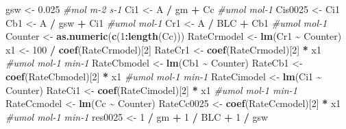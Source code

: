 \documentclass[
]{krantz}
\makeatletter
\newenvironment{Shaded}{\begin{snugshade}}{\end{snugshade}}
\newcommand{\CommentTok}[1]{\textcolor[rgb]{0.56,0.35,0.01}{\textit{#1}}}
\newcommand{\DecValTok}[1]{\textcolor[rgb]{0.00,0.00,0.81}{#1}}
\newcommand{\FloatTok}[1]{\textcolor[rgb]{0.00,0.00,0.81}{#1}}
\newcommand{\KeywordTok}[1]{\textcolor[rgb]{0.13,0.29,0.53}{\textbf{#1}}}
\newcommand{\NormalTok}[1]{#1}
\newcommand{\OperatorTok}[1]{\textcolor[rgb]{0.81,0.36,0.00}{\textbf{#1}}}
\newcommand{\StringTok}[1]{\textcolor[rgb]{0.31,0.60,0.02}{#1}}
\newenvironment{kframe}{%
\medskip{}
\setlength{\fboxsep}{.8em}
 \def\at@end@of@kframe{}%
 \ifinner\ifhmode%
  \def\at@end@of@kframe{\end{minipage}}%
  \begin{minipage}{\columnwidth}%
 \fi\fi%
 \def\FrameCommand##1{\hskip\@totalleftmargin \hskip-\fboxsep
 \colorbox{shadecolor}{##1}\hskip-\fboxsep
     \hskip-\linewidth \hskip-\@totalleftmargin \hskip\columnwidth}%
 \MakeFramed {\advance\hsize-\width
   \@totalleftmargin\z@ \linewidth\hsize
   \@setminipage}}%
 {\par\unskip\endMakeFramed%
 \at@end@of@kframe}
\renewenvironment{Shaded}{\begin{kframe}}{\end{kframe}}
\makeatother
\begin{document}
\begin{Shaded}
\begin{Highlighting}[]
\NormalTok{gsw \textless{}{-}}\StringTok{ }\FloatTok{0.025} \CommentTok{\#mol m{-}2 s{-}1}
\NormalTok{Ci1 \textless{}{-}}\StringTok{ }\NormalTok{A }\OperatorTok{/}\StringTok{ }\NormalTok{gm }\OperatorTok{+}\StringTok{ }\NormalTok{Cc }\CommentTok{\#umol mol{-}1}
\NormalTok{Cis0025 \textless{}{-}}\StringTok{ }\NormalTok{Ci1}
\NormalTok{Cb1 \textless{}{-}}\StringTok{ }\NormalTok{A }\OperatorTok{/}\StringTok{ }\NormalTok{gsw }\OperatorTok{+}\StringTok{ }\NormalTok{Ci1 }\CommentTok{\#umol mol{-}1}
\NormalTok{Cr1 \textless{}{-}}\StringTok{ }\NormalTok{A }\OperatorTok{/}\StringTok{ }\NormalTok{BLC }\OperatorTok{+}\StringTok{ }\NormalTok{Cb1 }\CommentTok{\#umol mol{-}1}
\NormalTok{Counter \textless{}{-}}\StringTok{ }\KeywordTok{as.numeric}\NormalTok{(}\KeywordTok{c}\NormalTok{(}\DecValTok{1}\OperatorTok{:}\KeywordTok{length}\NormalTok{(Cc)))}
\NormalTok{RateCrmodel \textless{}{-}}\StringTok{ }\KeywordTok{lm}\NormalTok{(Cr1 }\OperatorTok{\textasciitilde{}}\StringTok{ }\NormalTok{Counter)}
\NormalTok{x1 \textless{}{-}}\StringTok{ }\DecValTok{100} \OperatorTok{/}\StringTok{ }\KeywordTok{coef}\NormalTok{(RateCrmodel)[}\DecValTok{2}\NormalTok{]}
\NormalTok{RateCr1 \textless{}{-}}\StringTok{ }\KeywordTok{coef}\NormalTok{(RateCrmodel)[}\DecValTok{2}\NormalTok{] }\OperatorTok{*}\StringTok{ }\NormalTok{x1 }\CommentTok{\#umol mol{-}1 min{-}1}
\NormalTok{RateCbmodel \textless{}{-}}\StringTok{ }\KeywordTok{lm}\NormalTok{(Cb1 }\OperatorTok{\textasciitilde{}}\StringTok{ }\NormalTok{Counter)}
\NormalTok{RateCb1 \textless{}{-}}\StringTok{ }\KeywordTok{coef}\NormalTok{(RateCbmodel)[}\DecValTok{2}\NormalTok{] }\OperatorTok{*}\StringTok{ }\NormalTok{x1 }\CommentTok{\#umol mol{-}1 min{-}1}
\NormalTok{RateCimodel \textless{}{-}}\StringTok{ }\KeywordTok{lm}\NormalTok{(Ci1 }\OperatorTok{\textasciitilde{}}\StringTok{ }\NormalTok{Counter)}
\NormalTok{RateCi1 \textless{}{-}}\StringTok{ }\KeywordTok{coef}\NormalTok{(RateCimodel)[}\DecValTok{2}\NormalTok{] }\OperatorTok{*}\StringTok{ }\NormalTok{x1 }\CommentTok{\#umol mol{-}1 min{-}1}
\NormalTok{RateCcmodel \textless{}{-}}\StringTok{ }\KeywordTok{lm}\NormalTok{(Cc }\OperatorTok{\textasciitilde{}}\StringTok{ }\NormalTok{Counter)}
\NormalTok{RateCc0025 \textless{}{-}}\StringTok{ }\KeywordTok{coef}\NormalTok{(RateCcmodel)[}\DecValTok{2}\NormalTok{] }\OperatorTok{*}\StringTok{ }\NormalTok{x1 }\CommentTok{\#umol mol{-}1 min{-}1}
\NormalTok{res0025 \textless{}{-}}\StringTok{ }\DecValTok{1} \OperatorTok{/}\StringTok{ }\NormalTok{gm }\OperatorTok{+}\StringTok{ }\DecValTok{1} \OperatorTok{/}\StringTok{ }\NormalTok{BLC }\OperatorTok{+}\StringTok{ }\DecValTok{1} \OperatorTok{/}\StringTok{ }\NormalTok{gsw}


\end{Highlighting}
\end{Shaded}
\end{document}
